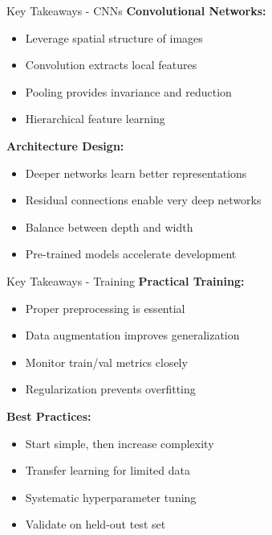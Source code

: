 \documentclass[aspectratio=169,10pt]{beamer}
\begin{document}
\begin{frame}{Key Takeaways - CNNs}
\textbf{Convolutional Networks:}
\begin{itemize}
\item Leverage spatial structure of images
\item Convolution extracts local features
\item Pooling provides invariance and reduction
\item Hierarchical feature learning
\end{itemize}

\textbf{Architecture Design:}
\begin{itemize}
\item Deeper networks learn better representations
\item Residual connections enable very deep networks
\item Balance between depth and width
\item Pre-trained models accelerate development
\end{itemize}
\end{frame}

\begin{frame}{Key Takeaways - Training}
\textbf{Practical Training:}
\begin{itemize}
\item Proper preprocessing is essential
\item Data augmentation improves generalization
\item Monitor train/val metrics closely
\item Regularization prevents overfitting
\end{itemize}

\textbf{Best Practices:}
\begin{itemize}
\item Start simple, then increase complexity
\item Transfer learning for limited data
\item Systematic hyperparameter tuning
\item Validate on held-out test set
\end{itemize}
\end{frame}
\end{document}
